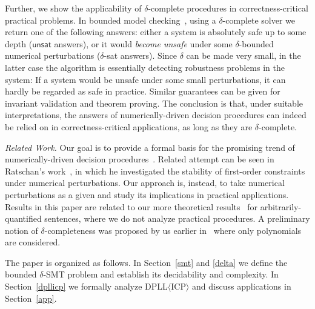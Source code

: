 \documentclass[envcountsect]{llncs}
\begin{document}

Further, we show the applicability of $\delta$-complete procedures in correctness-critical practical problems. In bounded model checking~\cite{DBLP:journals/fmsd/ClarkeBRZ01,DBLP:books/daglib/0007403}, using a $\delta$-complete solver we return one of the following answers: either a system is absolutely safe up to some depth ($\mathsf{unsat}$ answers), or it would {\em become unsafe} under some $\delta$-bounded numerical perturbations ($\delta$-{\sf sat} answers). Since $\delta$ can be made very small, in the latter case the algorithm is essentially detecting robustness problems in the system: If a system would be unsafe under some small perturbations, it can hardly be regarded as safe in practice. Similar guarantees can be given for invariant validation and theorem proving. The conclusion is that, under suitable interpretations, the answers of numerically-driven decision procedures can indeed be relied on in correctness-critical applications, as long as they are $\delta$-complete. 

{\em Related Work.} Our goal is to provide a formal basis for the promising trend of numerically-driven decision procedures~\cite{BorrallerasLNRR09,DBLP:conf/fmcad/NuzzoPSS10,HySAT,DBLP:conf/atva/EggersFH08,DBLP:conf/sefm/EggersRNF11,DBLP:conf/fmcad/Gao10,bern,cordic}.
Related attempt can be seen in Ratschan's work~\cite{DBLP:journals/jsc/Ratschan02}, in which he investigated the stability of first-order constraints under numerical perturbations. Our approach is, instead, to take numerical perturbations as a given and study its implications in practical applications. Results in this paper are related to our more theoretical results~\cite{gaoextended2} for arbitrarily-quantified sentences, where we do not analyze practical procedures. A preliminary notion of $\delta$-completeness was proposed by us earlier in~\cite{DBLP:conf/fmcad/Gao10} where only polynomials are considered.

The paper is organized as follows. In Section~\ref{smt} and \ref{delta} we define the bounded $\delta$-SMT problem and establish its decidability and complexity. In Section~\ref{dpllicp} we formally analyze DPLL$\langle$ICP$\rangle$ and discuss applications in Section~\ref{app}. 
\end{document}
